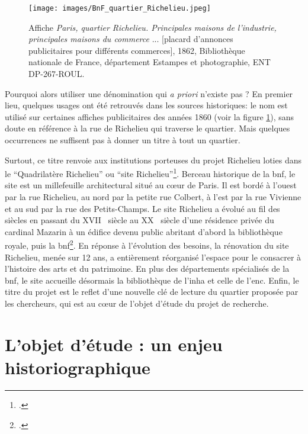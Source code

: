 \begin{figure}
    \centering
    \texttt{[image: images/BnF\_quartier\_Richelieu.jpeg]}
    \caption{Affiche \textit{Paris, quartier Richelieu. Principales maisons de l'industrie, principales maisons du commerce} ... [placard d'annonces publicitaires pour différents commerces], 1862, Bibliothèque nationale de France, département Estampes et photographie, ENT DP-267-ROUL.}
    \label{fig:richelieu_pub}
\end{figure}


Pourquoi alors utiliser une dénomination qui \textit{a priori} n'existe pas ? En premier lieu, quelques usages ont été retrouvés dans les sources historiques: le nom est utilisé sur certaines affiches publicitaires des années 1860 (voir la figure \ref{fig:richelieu_pub}), sans doute en référence à la rue de Richelieu qui traverse le quartier. Mais quelques occurrences ne suffisent pas à donner un titre à tout un quartier. 

Surtout, ce titre renvoie aux institutions porteuses du projet Richelieu loties dans le \enquote{Quadrilatère Richelieu} ou \enquote{site Richelieu}\footcite{BNFquadrilatere2024}. Berceau historique de la \acrlong{bnf}, le site est un millefeuille architectural situé au cœur de Paris. Il est bordé à l'ouest par la rue Richelieu, au nord par la petite rue Colbert, à l'est par la rue Vivienne et au sud par la rue des Petits-Champs. Le site Richelieu a évolué au fil des siècles en passant du XVII\ieme~ siècle au XX\ieme~ siècle d'une résidence privée du cardinal Mazarin à un édifice devenu public abritant d'abord la bibliothèque royale, puis la \acrshort{bnf}\footcite{BNFLhistoire2023}. En réponse à l'évolution des besoins, la rénovation du site Richelieu, menée sur 12 ans, a entièrement réorganisé l'espace pour le consacrer à l'histoire des arts et du patrimoine. En plus des départements spécialisés de la \acrlong{bnf}, le site accueille désormais la bibliothèque de l'\acrlong{inha} et celle de l'\acrlong{enc}. Enfin, le titre du projet est le reflet d'une nouvelle clé de lecture du quartier proposée par les chercheurs, qui est au cœur de l'objet d'étude du projet de recherche. 

\section{L'objet d'étude : un enjeu historiographique}

